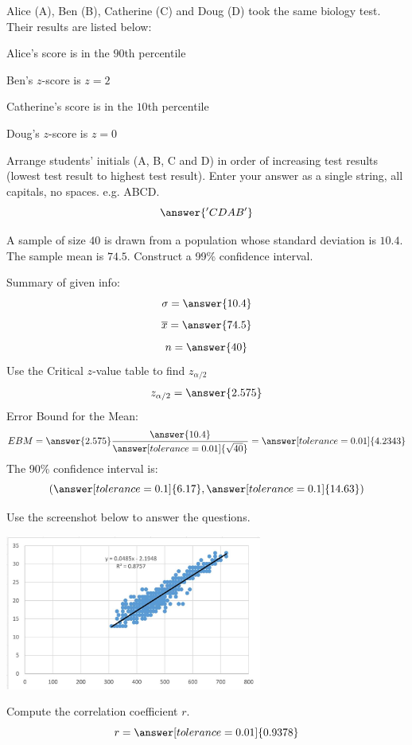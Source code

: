 \documentclass{ximera}
\begin{document}
\begin{problem}\label{prob:140finalprob3}
Alice (A), Ben (B), Catherine (C) and Doug (D) took the same biology test.  Their results are listed below: 

Alice's score is in the $90$th percentile 

Ben's $z$-score is $z = 2$ 

Catherine's score is in the $10$th percentile 

Doug's $z$-score is $z = 0$

Arrange students’ initials (A, B, C and D) in order of increasing test results (lowest test result to highest test result).  Enter your answer as a single string, all capitals, no spaces.  e.g. ABCD.
$$\answer{'CDAB'}$$
\end{problem}

\begin{problem}\label{prob:140finalprob4}
A sample of size $40$ is drawn from a population whose standard deviation is $10.4$.  The sample mean is $74.5$.  Construct a 99\% confidence interval.

Summary of given info:
$$\sigma=\answer{10.4}$$
$$\overline{x}=\answer{74.5}$$
$$n=\answer{40}$$
Use the Critical $z$-value table to find $z_{\alpha/2}$
$$z_{\alpha/2}=\answer{2.575}$$
Error Bound for the Mean:
$$EBM=\answer{2.575}\frac{\answer{10.4}}{\answer[tolerance=0.01]{\sqrt{40}}}=\answer[tolerance=0.01]{4.2343}$$
The 90\% confidence interval is:
$$(\answer[tolerance=0.1]{6.17},\answer[tolerance=0.1]{14.63})$$
\end{problem}

\begin{problem}\label{prob:140finalprob5}
Use the screenshot below to answer the questions.  

\begin{center}
\includegraphics[height=2in]{140finalpic1.jpg}
\end{center}

Compute the correlation coefficient $r$.
 $$r=\answer[tolerance=0.01]{0.9378}$$
\end{problem}
\end{document}
